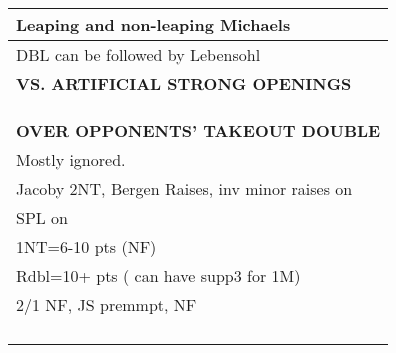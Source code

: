 \documentclass{article}
\begin{document}
{\begin{minipage}{90mm}
\begin{tabular}{| p{88mm} |}
                Leaping and non-leaping Michaels
		\\ \hline
                DBL can be followed by Lebensohl
		\\ \hline
		\textbf{VS. ARTIFICIAL STRONG OPENINGS} \\ \hline
		\\ \hline
		\\ \hline
		\\ \hline
		\textbf{OVER OPPONENTS' TAKEOUT DOUBLE} \\ \hline
                Mostly ignored.
		\\ \hline
                Jacoby 2NT, Bergen Raises, inv minor raises on
		\\ \hline
                SPL on
		\\ \hline
                1NT=6-10 pts (NF)
		\\ \hline
                Rdbl=10+ pts ( can have supp3 for 1M)
		\\ \hline
                2/1 NF, JS premmpt, NF
		\\ \hline
		\\ \hline
		\\ \hline
		\\ \hline
		\\ \hline
	\end{tabular}
\end{minipage}
}
\begin{minipage}{5mm}
	\begin{tabular}{| p{5mm} |}
	\end{tabular}
\end{minipage}
\end{document}
